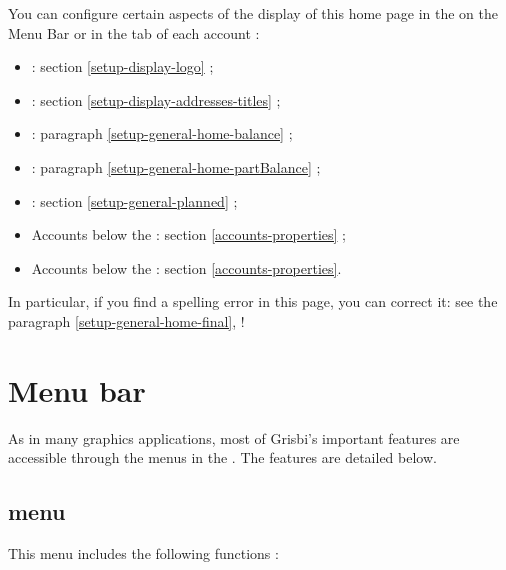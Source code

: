You can configure certain aspects of the display of this home page in the  on the Menu Bar or in the  tab of each account :
\begin{itemize}
	 \item {} : section \vref{setup-display-logo} ;
	 \item {} : section \vref{setup-display-addresses-titles} ;
	 \item {} : paragraph \vref{setup-general-home-balance} ;
	 \item {} : paragraph \vref{setup-general-home-partBalance} ;
	 \item {} : section \vref{setup-general-planned} ;
	 \item Accounts below the  : section \vref{accounts-properties} ;
	 \item Accounts below the  : section  \vref{accounts-properties}.
\end{itemize}

In particular, if you find a spelling error in this page, you can correct it: see the paragraph \vref{setup-general-home-final},  !


\section{Menu bar\label{home-menus}}

As in many graphics applications, most of Grisbi's important features are accessible through the menus in the . The features are detailed below.


\subsection{ menu\label{home-menus-file}}

This menu includes the following functions :

